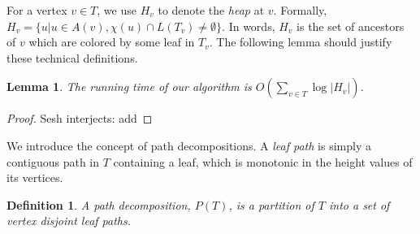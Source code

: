 \documentclass[11pt]{article}
\newtheorem{lemma}[theorem]{Lemma}
\newtheorem{definition}[theorem]{Definition}
\theoremstyle{definition}
\newcommand{\Lem}[1]{\hyperref[lem:#1]{Lemma~\ref*{lem:#1}}} %
\newcommand{\Reminder}[1]{{\color{red}#1}}
\newcommand{\Sesh}[1]{\Reminder{Sesh interjects: #1}}
\newcommand{\cost}{\mathop{cost}}
\begin{document}
For a vertex $v\in T$, we use $H_v$ to denote the \emph{heap} at $v$.
Formally, $H_v = \{u | u \in A(v), \chi(u) \cap L(T_v) \neq \emptyset\}$.
In words, $H_v$ is the set of ancestors of $v$ which are colored by some leaf in $T_v$.
The following lemma should justify these technical definitions.

\begin{lemma}
The running time of our algorithm is $O(\sum_{v \in T} \log |H_v|)$.
\end{lemma}

\begin{proof} \Sesh{add}

\end{proof}

%
%

We introduce the concept of path decompositions. A \emph{leaf path} is simply a contiguous path in $T$
containing a leaf, which is monotonic in the height values of its vertices.

\begin{definition}
\label{def:path} A \emph{path decomposition}, $P(T)$, is a partition of $T$ into 
 a set of vertex disjoint leaf paths.  
% 
\end{definition}
\end{document}
